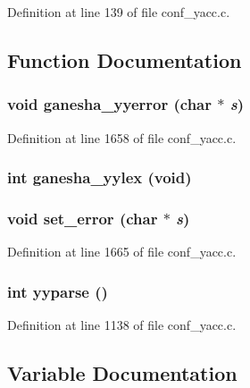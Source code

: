 


Definition at line 139 of file conf\_\-yacc.c.

\subsection{Function Documentation}
\subsubsection[{ganesha\_\-yyerror}]{\setlength{\rightskip}{0pt plus 5cm}void ganesha\_\-yyerror (char $\ast$ {\em s})}\label{conf__yacc_8c_abe72ff1c117b9d912de7e75a54944544}


Definition at line 1658 of file conf\_\-yacc.c.
\subsubsection[{ganesha\_\-yylex}]{\setlength{\rightskip}{0pt plus 5cm}int ganesha\_\-yylex (void)}\label{conf__yacc_8c_a6dc72eadca449113f3193c83b9cee719}
\subsubsection[{set\_\-error}]{\setlength{\rightskip}{0pt plus 5cm}void set\_\-error (char $\ast$ {\em s})}\label{conf__yacc_8c_afcb367845a58b51eb13929dc90243ac8}


Definition at line 1665 of file conf\_\-yacc.c.
\subsubsection[{yyparse}]{\setlength{\rightskip}{0pt plus 5cm}int yyparse ()}\label{conf__yacc_8c_acd8617a8f2ac0de8bc1cc032cf449e19}


Definition at line 1138 of file conf\_\-yacc.c.

\subsection{Variable Documentation}
